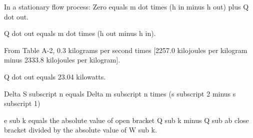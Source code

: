 In a stationary flow process: 
Zero equals m dot times (h in minus h out) plus Q dot out.

Q dot out equals m dot times (h out minus h in).

From Table A-2, 0.3 kilograms per second times [2257.0 kilojoules per kilogram minus 2333.8 kilojoules per kilogram].

Q dot out equals 23.04 kilowatts.

Delta S subscript n equals Delta m subscript n times (s subscript 2 minus s subscript 1)

e sub k equals the absolute value of open bracket Q sub k minus Q sub ab close bracket divided by the absolute value of W sub k.